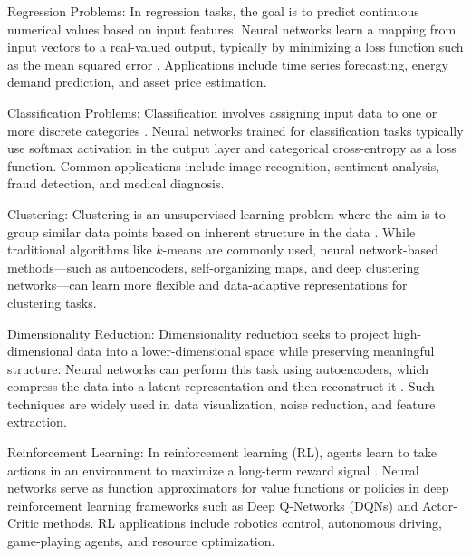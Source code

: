 Regression Problems: In regression tasks, the goal is to predict continuous numerical values based on input features. Neural networks learn a mapping from input vectors to a real-valued output, typically by minimizing a loss function such as the mean squared error \parencite[p.~99]{goodfellow2016deeplearning}. Applications include time series forecasting, energy demand prediction, and asset price estimation.

Classification Problems: Classification involves assigning input data to one or more discrete categories \parencite[p.~98]{goodfellow2016deeplearning}. Neural networks trained for classification tasks typically use softmax activation in the output layer and categorical cross-entropy as a loss function. Common applications include image recognition, sentiment analysis, fraud detection, and medical diagnosis.

Clustering: Clustering is an unsupervised learning problem where the aim is to group similar data points based on inherent structure in the data \parencite{aljalbout2018clustering}. While traditional algorithms like $k$-means are commonly used, neural network-based methods—such as autoencoders, self-organizing maps, and deep clustering networks—can learn more flexible and data-adaptive representations for clustering tasks.

Dimensionality Reduction: Dimensionality reduction seeks to project high-dimensional data into a lower-dimensional space while preserving meaningful structure. Neural networks can perform this task using autoencoders, which compress the data into a latent representation and then reconstruct it \parencite{hinton2006dimensionalityreduction}. Such techniques are widely used in data visualization, noise reduction, and feature extraction.

Reinforcement Learning: In reinforcement learning (RL), agents learn to take actions in an environment to maximize a long-term reward signal \parencite[pp.~2--3]{sutton2015reinforcement}. Neural networks serve as function approximators for value functions or policies in deep reinforcement learning frameworks such as Deep Q-Networks (DQNs) and Actor-Critic methods. RL applications include robotics control, autonomous driving, game-playing agents, and resource optimization.

